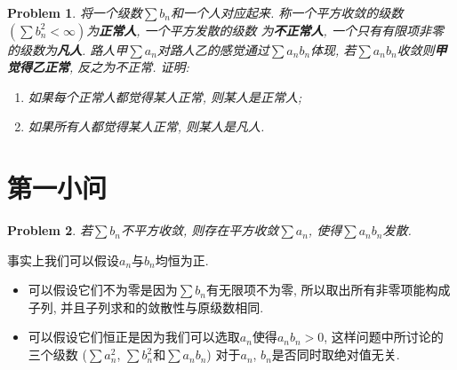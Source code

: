 \documentclass[a4paper, 12pt]{ctexart}
\title{\TITLE}
\author{\AUTHOR}
\date{\today}
\theoremstyle{plain}
\newtheorem{problem}{Problem}[section]
\theoremstyle{plain}
\theoremstyle{plain}
\theoremstyle{nonumberplain}
\begin{document}

    \maketitle
    \thispagestyle{empty}





    \newpage
    \pagestyle{fancy}
    \linenumbers

    \begin{problem}
        将一个级数$\sum{b_{n}}$和一个人对应起来. 称一个平方收敛的级数
        $(\sum{b_{n}^{2}}<\infty)$为\textbf{正常人}, 一个平方发散的级数
        为\textbf{不正常人}, 一个只有有限项非零的级数为\textbf{凡人}.
        路人甲$\sum{a_{n}}$对路人乙的感觉通过$\sum{a_{n}b_{n}}$体现,
        若$\sum{a_{n}b_{n}}$收敛则\textbf{甲觉得乙正常}, 反之为不正常.
        证明:
        \begin{enumerate}
            \item 如果每个正常人都觉得某人正常, 则某人是正常人;
            \item 如果所有人都觉得某人正常, 则某人是凡人.
        \end{enumerate}
    \end{problem}

    \section{第一小问}

    \begin{problem}
        若$\sum{b_{n}}$不平方收敛, 则存在平方收敛$\sum{a_{n}}$,
        使得$\sum{a_{n}b_{n}}$发散.
    \end{problem}

    事实上我们可以假设$a_{n}$与$b_{n}$均恒为正.
    \begin{itemize}
        \item

        可以假设它们不为零是因为$\sum{b_{n}}$有无限项不为零,
        所以取出所有非零项能构成子列, 并且子列求和的敛散性与原级数相同.

        \item

        可以假设它们恒正是因为我们可以选取$a_{n}$使得$a_{n}b_{n}>0$,
        这样问题中所讨论的三个级数
        ($\sum{a_{n}^{2}}$, $\sum{b_{n}^{2}}$和$\sum{a_{n}b_{n}}$)
        对于$a_{n}$, $b_{n}$是否同时取绝对值无关.
    \end{itemize}
\end{document}
